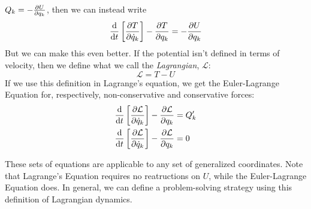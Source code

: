 \documentclass[a4paper]{article}
\begin{document}
$Q_k = -\frac{\partial U}{\partial q_k}$, then we can instead write
\[ \frac{\mathrm{d}}{\mathrm{d} t}\left[\frac{\partial T}{\partial \dot{q}_k}\right]-\frac{\partial T}{\partial q_k} =
	-\frac{\partial U}{\partial q_k} \]
But we can make this even better. If the potential isn't defined in terms of
velocity, then we define what we call the \emph{Lagrangian}, $\mathcal{L}$:
\[ \mathcal{L} = T - U \]
If we use this definition in Lagrange's equation, we get the Euler-Lagrange
Equation for, respectively, non-conservative and conservative forces:
\begin{align*}
	\frac{\mathrm{d}}{\mathrm{d} t}\left[\frac{\partial \mathcal{L}}{\partial \dot{q}_k}\right]
	-\frac{\partial \mathcal{L}}{\partial q_k} &= Q_k'\\
	\frac{\mathrm{d}}{\mathrm{d} t}\left[\frac{\partial \mathcal{L}}{\partial \dot{q}_k}\right]
	-\frac{\partial \mathcal{L}}{\partial q_k} &= 0\\
\end{align*}

These sets of equations are applicable to any set of generalized coordinates.
Note that Lagrange's Equation requires no reatructions on $U$, while
the Euler-Lagrange Equation does. In general, we can define a problem-solving
strategy using this definition of Lagrangian dynamics.
\end{document}
